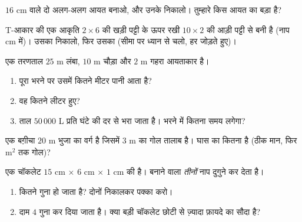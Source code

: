 \begin{exercise}[$\star$]\label{exo:g6:measure:8}
$16$ cm  वाले दो अलग-अलग आयत बनाओ, और उनके 
निकालो। तुम्हारे किस आयत का  बड़ा है?
\end{exercise}

\begin{exercise}[$\star\star$]\label{exo:g6:measure:9}
T-आकार की एक आकृति $2 \times 6$ की खड़ी पट्टी के ऊपर रखी
$10 \times 2$ की आड़ी पट्टी से बनी है (नाप cm में)। उसका
 निकालो, फिर उसका  (सीमा पर ध्यान से चलो, हर
 जोड़ते हुए)।
\end{exercise}

\begin{exercise}[$\star\star$]\label{exo:g6:measure:10}
एक तरणताल $25$ m लंबा, $10$ m चौड़ा और $2$ m गहरा आयताकार 
है।
\begin{enumerate}
  \item पूरा भरने पर उसमें कितने  मीटर पानी आता है?
  \item वह कितने लीटर हुए?
  \item ताल $50\,000$ L प्रति घंटे की दर से भरा जाता है। भरने
        में कितना समय लगेगा?
\end{enumerate}
\end{exercise}

\begin{exercise}[$\star\star$]\label{exo:g6:measure:11}
एक बग़ीचा $20$ m भुजा का वर्ग है जिसमें $3$ m  का गोल
तालाब है। घास का  कितना है (ठीक मान, फिर m$^2$ तक
गोल)?
\end{exercise}

\begin{exercise}[$\star\star\star$]\label{exo:g6:measure:12}
एक चॉकलेट $15$ cm $\times$ $6$ cm $\times$ $1$ cm की है।
बनाने वाला \emph{तीनों} नाप दुगुने कर देता है।
\begin{enumerate}
  \item {} कितने गुना हो जाता है? दोनों  निकालकर पक्का
        करो।
  \item दाम $4$ गुना कर दिया जाता है। क्या बड़ी चॉकलेट छोटी से
        ज़्यादा फ़ायदे का सौदा है?
\end{enumerate}
\end{exercise}

